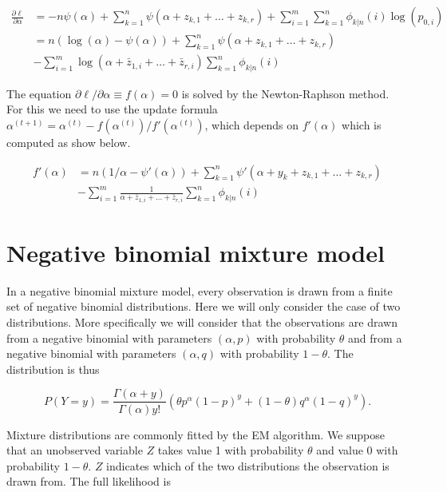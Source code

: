 \documentclass[12pt]{article}
\begin{document}
\begin{appendices}
    \begin{align}
      \frac{\partial \ell}{\partial \alpha}
      &= -n\psi(\alpha) + \sum_{k=1}^n 
      \psi(\alpha+z_{k,1}+\dots+z_{k,r})
      +\sum_{i=1}^m\sum_{k=1}^n \phi_{k|n}(i) \log(p_{0,i}) \nonumber \\
      &= n(\log(\alpha) - \psi(\alpha)) + \sum_{k=1}^n
      \psi(\alpha+z_{k,1}+\dots+z_{k,r}) \nonumber \\
      &- \sum_{i=1}^m \log(\alpha + \bar{z}_{1,i} +
      \ldots + \bar{z}_{r,i}) \sum_{k=1}^n\phi_{k|n}(i)
\label{lalpha}
    \end{align}

    The equation $\partial \ell / \partial \alpha \equiv f(\alpha) = 0$
    is solved by the Newton-Raphson method. For this we need to
    use the update formula
    $\alpha^{(t+1)} = \alpha^{(t)} - f(\alpha^{(t)})/f'(\alpha^{(t)})$,
    which depends on $f'(\alpha)$ which is computed as show below.
  
    \begin{align*}
    f'(\alpha) &= n\left(1/\alpha-\psi'(\alpha) \right) +
      \sum_{k=1}^n\psi'(\alpha+y_k+z_{k,1}+\ldots+ z_{k,r}) \\
      &- \sum_{i=1}^m \frac{1}{\alpha + \bar{z}_{1,i} +
      \ldots + \bar{z}_{r,i}} \sum_{k=1}^n\phi_{k|n}(i)
    \end{align*}

  \section{Negative binomial mixture model}
\label{mixture}

    In a negative binomial mixture model, every observation is drawn
    from a finite set of negative binomial distributions. Here we
    will only consider the case of two distributions. More specifically
    we will consider that the observations are drawn from a negative
    binomial with parameters $(\alpha, p)$ with probability $\theta$
    and from a negative binomial with parameters $(\alpha, q)$
    with probability $1-\theta$. The distribution is thus

    \begin{equation}
    P(Y = y) = \frac{\Gamma(\alpha+y)}{\Gamma(\alpha)y!}
    \left(\theta p^{\alpha}(1-p)^y + (1-\theta)q^{\alpha}(1-q)^y\right).
    \end{equation}

    Mixture distributions are commonly fitted by the EM algorithm.
    We suppose that an unobserved variable $Z$ takes value 1 with
    probability $\theta$ and value 0 with probability $1-\theta$.
    $Z$ indicates which of the two distributions the
    observation is drawn from. The full likelihood is 


\end{appendices}
\end{document}
